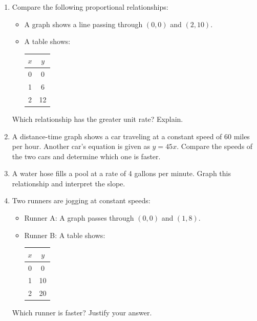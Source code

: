 \documentclass[12pt]{article}
\begin{document}
\vspace{1em}

\begin{tcolorbox}[colframe=black!60, colback=white, 
coltitle=black, colbacktitle=black!15, fonttitle=\bfseries\Large, 
title=Problems, halign title=center, left=10pt, right=10pt, top=10pt, bottom=60pt]
\begin{enumerate}[start=6, itemsep=3em]
    \item Compare the following proportional relationships:
    \begin{itemize}
        \item A graph shows a line passing through \((0, 0)\) and \((2, 10)\).
        \item A table shows:
        \begin{tabular}{|c|c|}
        \hline
        \(x\) & \(y\) \\
        \hline
        0 & 0 \\
        1 & 6 \\
        2 & 12 \\
        \hline
        \end{tabular}
    \end{itemize}
    Which relationship has the greater unit rate? Explain.
    \item A distance-time graph shows a car traveling at a constant speed of 60 miles per hour. Another car's equation is given as \(y = 45x\). Compare the speeds of the two cars and determine which one is faster.
    \item A water hose fills a pool at a rate of 4 gallons per minute. Graph this relationship and interpret the slope.
    \item Two runners are jogging at constant speeds:
    \begin{itemize}
        \item Runner A: A graph passes through \((0, 0)\) and \((1, 8)\).
        \item Runner B: A table shows:
        \begin{tabular}{|c|c|}
        \hline
        \(x\) & \(y\) \\
        \hline
        0 & 0 \\
        1 & 10 \\
        2 & 20 \\
        \hline
        \end{tabular}
    \end{itemize}
    Which runner is faster? Justify your answer.
\end{enumerate}
\end{tcolorbox}
\end{document}
